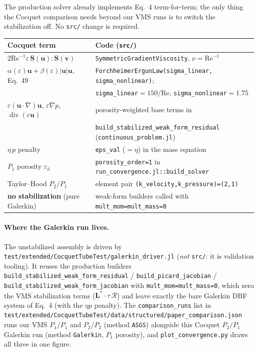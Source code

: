 \documentclass[11pt]{article}
\newcommand{\uu}{\bm{u}}
\newcommand{\vv}{\bm{v}}
\newcommand{\grad}{\nabla}
\newcommand{\dive}{\operatorname{div}}
\newcommand{\Reyn}{\mathrm{Re}}
\newcommand{\Sten}{\bm{S}}
\begin{document}
The production solver already implements Eq.~4 term-for-term; the only thing the Cocquet comparison
needs beyond our VMS runs is to switch the stabilization off. No \texttt{src/} change is required.

\begin{center}
\begin{tabular}{@{}ll@{}}
\hline
Cocquet term & Code (\texttt{src/}) \\
\hline
$2\Reyn^{-1}\varepsilon\,\Sten(\uu){:}\Sten(\vv)$ & \texttt{SymmetricGradientViscosity}, $\nu=\Reyn^{-1}$ \\
$\alpha(\varepsilon)\uu+\beta(\varepsilon)|\uu|\uu$, Eq.~49 & \texttt{ForchheimerErgunLaw(sigma\_linear,\,sigma\_nonlinear)}; \\
 & \texttt{sigma\_linear}$=150/\Reyn$, \texttt{sigma\_nonlinear}$=1.75$ \\
$\varepsilon(\uu\cdot\grad)\uu$, $\varepsilon\grad p$, $\dive(\varepsilon\uu)$ & porosity-weighted base terms in \\
 & \texttt{build\_stabilized\_weak\_form\_residual} (\texttt{continuous\_problem.jl}) \\
$\eta\,p$ penalty & \texttt{eps\_val} ($=\eta$) in the mass equation \\
$P_1$ porosity $\varepsilon_h$ & \texttt{porosity\_order=1} in \texttt{run\_convergence.jl::build\_solver} \\
Taylor--Hood $P_2/P_1$ & element pair \texttt{(k\_velocity,k\_pressure)=(2,1)} \\
\textbf{no stabilization} (pure Galerkin) & weak-form builders called with
   \texttt{mult\_mom=mult\_mass=0} \\
\hline
\end{tabular}
\end{center}

\paragraph{Where the Galerkin run lives.} The unstabilized assembly is driven by
\texttt{test/extended/CocquetTubeTest/galerkin\_driver.jl} (\emph{not} \texttt{src/}: it is validation
tooling). It reuses the production builders
\texttt{build\_stabilized\_weak\_form\_residual} / \texttt{build\_picard\_jacobian} /
\texttt{build\_stabilized\_weak\_form\_jacobian} with \texttt{mult\_mom=mult\_mass=0}, which zero the VMS
stabilization terms ($\bm L^\ast\!\cdot\tau\,\mathcal R$) and leave exactly the bare Galerkin DBF system
of Eq.~4 (with the $\eta p$ penalty). The \texttt{comparison\_runs} list in
\texttt{test/extended/CocquetTubeTest/data/structured/paper\_comparison.json} runs our VMS $P_1/P_1$ and $P_2/P_2$ (method \texttt{ASGS}) alongside
this Cocquet $P_2/P_1$ Galerkin run (method \texttt{Galerkin}, $P_1$ porosity), and
\texttt{plot\_convergence.py} draws all three in one figure.
\end{document}
